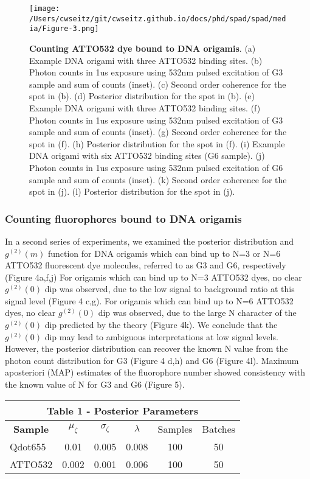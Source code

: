\clearpage
\begin{figure}
\centering
\texttt{[image: /Users/cwseitz/git/cwseitz.github.io/docs/phd/spad/spad/media/Figure-3.png]}
\caption{\textbf{Counting ATTO532 dye bound to DNA origamis}. (a) Example DNA origami with three ATTO532 binding sites. (b) Photon counts in 1us exposure using 532nm pulsed excitation of G3 sample and sum of counts (inset). (c) Second order coherence for the spot in (b). (d) Posterior distribution for the spot in (b). (e) Example DNA origami with three ATTO532 binding sites. (f) Photon counts in 1us exposure using 532nm pulsed excitation of G3 sample and sum of counts (inset). (g) Second order coherence for the spot in (f). (h) Posterior distribution for the spot in (f). (i) Example DNA origami with six ATTO532 binding sites (G6 sample). (j) Photon counts in 1us exposure using 532nm pulsed excitation of G6 sample and sum of counts (inset). (k) Second order coherence for the spot in (j). (l) Posterior distribution for the spot in (j).}
\label{fig:atto}
\end{figure}  

\subsubsection{Counting fluorophores bound to DNA origamis}

In a second series of experiments, we examined the posterior distribution and $g^{(2)}(m)$ function for DNA origamis which can bind up to N=3 or N=6 ATTO532 fluorescent dye molecules, referred to as G3 and G6, respectively (Figure 4a,f,j) For origamis which can bind up to N=3 ATTO532 dyes, no clear $g^{(2)}(0)$ dip was observed, due to the low signal to background ratio at this signal level (Figure 4 c,g). For origamis which can bind up to N=6 ATTO532 dyes, no clear $g^{(2)}(0)$ dip was observed, due to the large N character of the $g^{(2)}(0)$ dip predicted by the theory (Figure 4k). We conclude that the $g^{(2)}(0)$ dip may lead to ambiguous interpretations at low signal levels. However, the posterior distribution can recover the known N value from the photon count distribution for G3 (Figure 4 d,h) and G6 (Figure 4l). Maximum aposteriori (MAP) estimates of the fluorophore number showed consistency with the known value of N for G3 and G6 (Figure 5). 

\begin{table}
\centering
\begin{tabular}{lccccc}
\multicolumn{6}{c}{\textbf{Table 1 - Posterior Parameters}} \\ \hline
\multicolumn{1}{c}{\textbf{Sample}}  & $\mu_{\zeta}$ & $\sigma_{\zeta}$ & $\lambda$ & Samples & Batches \\
Qdot655 & 0.01 & 0.005 & 0.008 & 100 & 50 \\
ATTO532 & 0.002 & 0.001 & 0.006 & 100 & 50 \\
\end{tabular}
\end{table}

